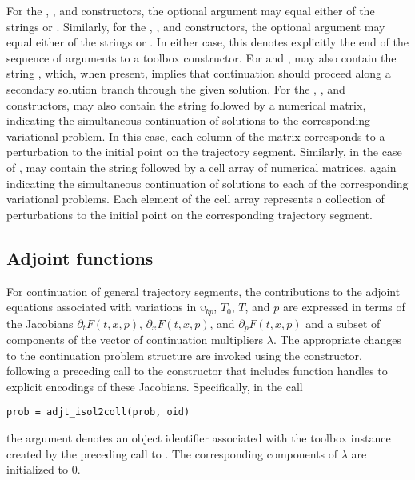For the , , and  constructors, the optional  argument may equal either of the strings  or . Similarly, for the , , and  constructors, the optional  argument may equal either of the strings  or . In either case, this denotes explicitly the end of the sequence of arguments to a  toolbox constructor. For  and ,  may also contain the string , which, when present, implies that continuation should proceed along a secondary solution branch through the given solution. For the , , and  constructors,  may also contain the string  followed by a numerical matrix, indicating the simultaneous continuation of solutions to the corresponding variational problem. In this case, each column of the matrix corresponds to a perturbation to the initial point on the trajectory segment. Similarly, in the case of ,  may contain the string  followed by a cell array of numerical matrices, again indicating the simultaneous continuation of solutions to each of the corresponding variational problems. Each element of the cell array represents a collection of perturbations to the initial point on the corresponding trajectory segment.

\subsection{Adjoint functions}
For continuation of general trajectory segments, the contributions to the adjoint equations associated with variations in $\upsilon_{bp}$, $T_0$, $T$, and $p$ are expressed in terms of the Jacobians $\partial_t F(t,x,p)$, $\partial_x F(t,x,p)$, and $\partial_p F(t,x,p)$ and a subset of components of the vector of continuation multipliers $\lambda$. The appropriate changes to the continuation problem structure are invoked using the  constructor, following a preceding call to the  constructor that includes function handles to explicit encodings of these Jacobians.  Specifically, in the call
\begin{lstlisting}[language=coco-highlight]
prob = adjt_isol2coll(prob, oid)
\end{lstlisting}
the  argument denotes an object identifier associated with the toolbox instance created by the preceding call to . The corresponding components of $\lambda$ are initialized to $0$.

